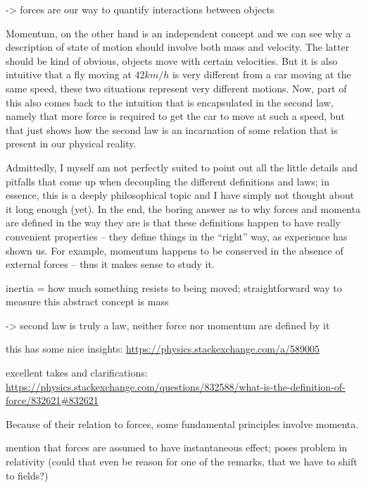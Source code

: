 \documentclass[../class_mech_main.tex]{subfiles}
\begin{document}
-> forces are our way to quantify interactions between objects

Momentum, on the other hand is an independent concept and we can see why a description of state of motion should involve both mass and velocity. The latter should be kind of obvious, objects move with certain velocities. But it is also intuitive that a fly moving at $42 km/h$ is very different from a car moving at the same speed, these two situations represent very different motions.
Now, part of this also comes back to the intuition that is encapsulated in the second law, namely that more force is required to get the car to move at such a speed, but that just shows how the second law is an incarnation of some relation that is present in our physical reality. 


Admittedly, I myself am not perfectly suited to point out all the little details and pitfalls that come up when decoupling the different definitions and laws; in essence, this is a deeply philosophical topic and I have simply not thought about it long enough (yet). In the end, the boring answer as to why forces and momenta are defined in the way they are is that these definitions happen to have really convenient properties -- they define things in the \enquote{right} way, as experience has shown us. For example, momentum happens to be conserved in the absence of external forces -- thus it makes sense to study it.


inertia = how much something resists to being moved; straightforward way to measure this abstract concept is mass


-> second law is truly a law, neither force nor momentum are defined by it


this has some nice insights: \url{https://physics.stackexchange.com/a/589005}


excellent takes and clarifications: \url{https://physics.stackexchange.com/questions/832588/what-is-the-definition-of-force/832621#832621}



Because of their relation to forces, some fundamental principles involve momenta. 



mention that forces are assumed to have instantaneous effect; poses problem in relativity (could that even be reason for one of the remarks, that we have to shift to fields?)
\end{document}
